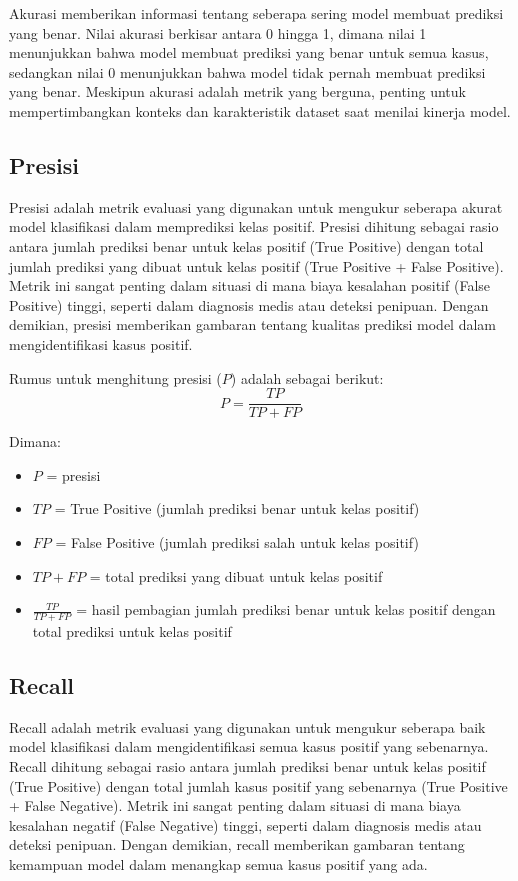 Akurasi memberikan informasi tentang seberapa sering model membuat prediksi yang benar. Nilai akurasi berkisar antara 0 hingga 1, dimana nilai 1 menunjukkan bahwa model membuat prediksi yang benar untuk semua kasus, sedangkan nilai 0 menunjukkan bahwa model tidak pernah membuat prediksi yang benar. Meskipun akurasi adalah metrik yang berguna, penting untuk mempertimbangkan konteks dan karakteristik dataset saat menilai kinerja model.

\subsection{Presisi}
Presisi adalah metrik evaluasi yang digunakan untuk mengukur seberapa akurat model klasifikasi dalam memprediksi kelas positif. Presisi dihitung sebagai rasio antara jumlah prediksi benar untuk kelas positif (True Positive) dengan total jumlah prediksi yang dibuat untuk kelas positif (True Positive + False Positive). Metrik ini sangat penting dalam situasi di mana biaya kesalahan positif (False Positive) tinggi, seperti dalam diagnosis medis atau deteksi penipuan. Dengan demikian, presisi memberikan gambaran tentang kualitas prediksi model dalam mengidentifikasi kasus positif. \parencite{jain2016feature}

Rumus untuk menghitung presisi ($P$) adalah sebagai berikut:
\begin{equation}
    P = \frac{TP}{TP + FP}
\end{equation}

Dimana:
\begin{itemize}
    \item $P$ = presisi
    \item $TP$ = True Positive (jumlah prediksi benar untuk kelas positif)
    \item $FP$ = False Positive (jumlah prediksi salah untuk kelas positif)
    \item $TP + FP$ = total prediksi yang dibuat untuk kelas positif
    \item $\frac{TP}{TP + FP}$ = hasil pembagian jumlah prediksi benar untuk kelas positif dengan total prediksi untuk kelas positif
\end{itemize}

\subsection{Recall}
Recall adalah metrik evaluasi yang digunakan untuk mengukur seberapa baik model klasifikasi dalam mengidentifikasi semua kasus positif yang sebenarnya. Recall dihitung sebagai rasio antara jumlah prediksi benar untuk kelas positif (True Positive) dengan total jumlah kasus positif yang sebenarnya (True Positive + False Negative). Metrik ini sangat penting dalam situasi di mana biaya kesalahan negatif (False Negative) tinggi, seperti dalam diagnosis medis atau deteksi penipuan. Dengan demikian, recall memberikan gambaran tentang kemampuan model dalam menangkap semua kasus positif yang ada. \parencite{jain2016feature}

